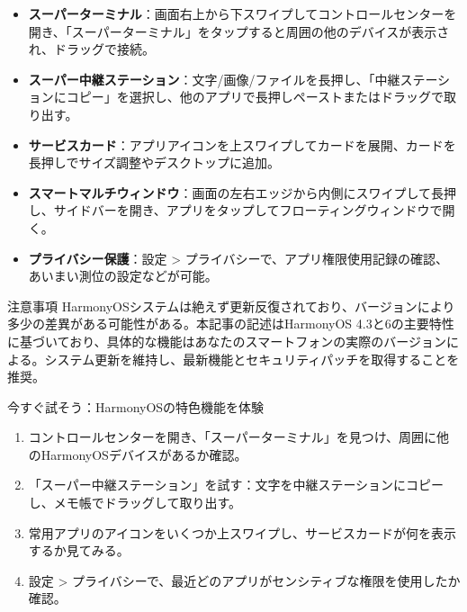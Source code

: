 
\begin{itemize}
  \item \textbf{スーパーターミナル}：画面右上から下スワイプしてコントロールセンターを開き、「スーパーターミナル」をタップすると周囲の他のデバイスが表示され、ドラッグで接続。
  \item \textbf{スーパー中継ステーション}：文字/画像/ファイルを長押し、「中継ステーションにコピー」を選択し、他のアプリで長押しペーストまたはドラッグで取り出す。
  \item \textbf{サービスカード}：アプリアイコンを上スワイプしてカードを展開、カードを長押しでサイズ調整やデスクトップに追加。
  \item \textbf{スマートマルチウィンドウ}：画面の左右エッジから内側にスワイプして長押し、サイドバーを開き、アプリをタップしてフローティングウィンドウで開く。
  \item \textbf{プライバシー保護}：設定 > プライバシーで、アプリ権限使用記録の確認、あいまい測位の設定などが可能。
\end{itemize}

\begin{tcbwarn}{注意事項}
HarmonyOSシステムは絶えず更新反復されており、バージョンにより多少の差異がある可能性がある。本記事の記述はHarmonyOS 4.3と6の主要特性に基づいており、具体的な機能はあなたのスマートフォンの実際のバージョンによる。システム更新を維持し、最新機能とセキュリティパッチを取得することを推奨。

\end{tcbwarn}

\begin{tcbpractice}{今すぐ試そう：HarmonyOSの特色機能を体験}
\begin{enumerate}
  \item コントロールセンターを開き、「スーパーターミナル」を見つけ、周囲に他のHarmonyOSデバイスがあるか確認。
  \item 「スーパー中継ステーション」を試す：文字を中継ステーションにコピーし、メモ帳でドラッグして取り出す。
  \item 常用アプリのアイコンをいくつか上スワイプし、サービスカードが何を表示するか見てみる。
  \item 設定 > プライバシーで、最近どのアプリがセンシティブな権限を使用したか確認。
\end{enumerate}

\end{tcbpractice}
